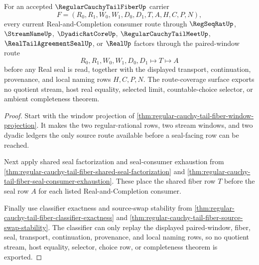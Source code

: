 \begin{theorem}
\label{thm:regular-cauchy-tail-fiber-real-completion-route-coverage}
For an accepted $\RegularCauchyTailFiberUp$ carrier
$$
F=(R_0,R_1,W_0,W_1,D_0,D_1,T,A,H,C,P,N),
$$
every current Real-and-Completion consumer route through $\RegSeqRatUp$, $\StreamNameUp$, $\DyadicRatCoreUp$, $\RegularCauchyTailMeetUp$, $\RealTailAgreementSealUp$, or $\RealUp$ factors through the paired-window route
$$
R_0,R_1,W_0,W_1,D_0,D_1 \longmapsto T \longmapsto A
$$
before any Real seal is read, together with the displayed transport, continuation, provenance, and local naming rows $H,C,P,N$. The route-coverage surface exports no quotient stream, host real equality, selected limit, countable-choice selector, or ambient completeness theorem.
\end{theorem}
\begin{proof}
Start with the window projection of \autoref{thm:regular-cauchy-tail-fiber-window-projection}. It makes the two regular-rational rows, two stream windows, and two dyadic ledgers the only source route available before a seal-facing row can be reached.

Next apply shared seal factorization and seal-consumer exhaustion from \autoref{thm:regular-cauchy-tail-fiber-shared-seal-factorization} and \autoref{thm:regular-cauchy-tail-fiber-seal-consumer-exhaustion}. These place the shared fiber row $T$ before the seal row $A$ for each listed Real-and-Completion consumer.

Finally use classifier exactness and source-swap stability from \autoref{thm:regular-cauchy-tail-fiber-classifier-exactness} and \autoref{thm:regular-cauchy-tail-fiber-source-swap-stability}. The classifier can only replay the displayed paired-window, fiber, seal, transport, continuation, provenance, and local naming rows, so no quotient stream, host equality, selector, choice row, or completeness theorem is exported.
\end{proof}

